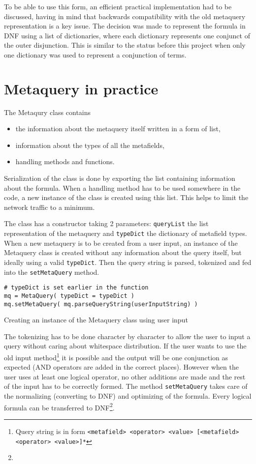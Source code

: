 To be able to use this form, an efficient practical implementation had to be discussed, having in 
mind that backwards compatibility with the old metaquery representation is a key issue. The decision 
was made to represent the formula in DNF using a list of dictionaries, where each dictionary 
represents one conjunct of the outer disjunction. This is similar to the status before this project
when only one dictionary was used to represent a conjunction of terms. 

\section{Metaquery in practice}

The Metaqury class contains 
\begin{itemize}
\item the information about the metaquery itself written in a form of list,
\item information about the types of all the metafields,
\item handling methods and functions.
\end{itemize}
Serialization of the class is done by exporting the list containing information about the formula. 
When a handling method has to be used somewhere in the code, a new instance of the class is created 
using this list. This helps to limit the network traffic to a minimum. 

The class has a constructor taking 2 parameters: \texttt{queryList} the list representation of the 
metaquery and \texttt{typeDict} the dictionary of metafield types. When a new metaquery is to be 
created from a user input, an instance of the Metaquery class is created without any information
about the query itself, but ideally using a valid \texttt{typeDict}. Then the query string is parsed, tokenized and fed into the \texttt{setMetaQuery} method.

\begin{listing}
\begin{verbatim}
# typeDict is set earlier in the function
mq = MetaQuery( typeDict = typeDict )
mq.setMetaQuery( mq.parseQueryString(userInputString) )
\end{verbatim}
\caption{Creating an instance of the Metaquery class using user input}
\end{listing}

The tokenizing has to be done character by character to allow the user to input a query without 
caring about whitespace distribution. If the user wants to use the old input method\footnote{
Query string is in form \texttt{<metafield> <operator> <value> [<metafield> <operator> <value>]*}}
it is possible and the output will be one conjunction as expected (AND operators are added in the
correct places). However when the user uses at least one logical operator, no other additions are made
and the rest of the input has to be correctly formed. The method \texttt{setMetaQuery} takes care of 
the normalizing (converting to DNF) and optimizing of the formula. Every logical formula 
can be transferred to DNF\footnote{}.%
